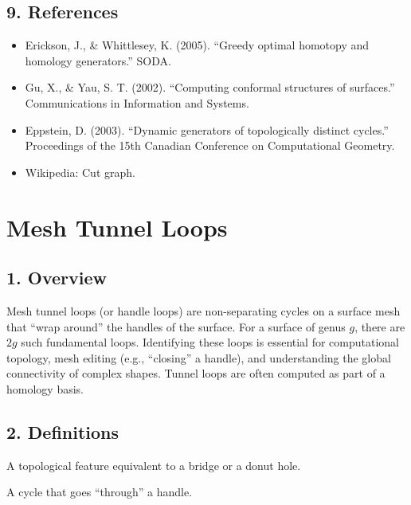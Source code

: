 \subsection{9. References}

\begin{itemize}
    \item Erickson, J., \& Whittlesey, K. (2005). ``Greedy optimal homotopy and homology generators.'' SODA.
    \item Gu, X., \& Yau, S. T. (2002). ``Computing conformal structures of surfaces.'' Communications in Information and Systems.
    \item Eppstein, D. (2003). ``Dynamic generators of topologically distinct cycles.'' Proceedings of the 15th Canadian Conference on Computational Geometry.
    \item Wikipedia: Cut graph.
\end{itemize}

\section{Mesh Tunnel Loops}
\label{sec:mesh_tunnel_loops}

\subsection{1. Overview}

Mesh tunnel loops (or handle loops) are non-separating cycles on a surface mesh that ``wrap around'' the handles of the surface. For a surface of genus $g$, there are $2g$ such fundamental loops. Identifying these loops is essential for computational topology, mesh editing (e.g., ``closing'' a handle), and understanding the global connectivity of complex shapes. Tunnel loops are often computed as part of a homology basis.

\subsection{2. Definitions}

\begin{definition}[Handle]\label{def:handle}
A topological feature equivalent to a bridge or a donut hole.
\end{definition}

\begin{definition}\label{def:tunnel_loop}
A cycle that goes ``through'' a handle.
\end{definition}

